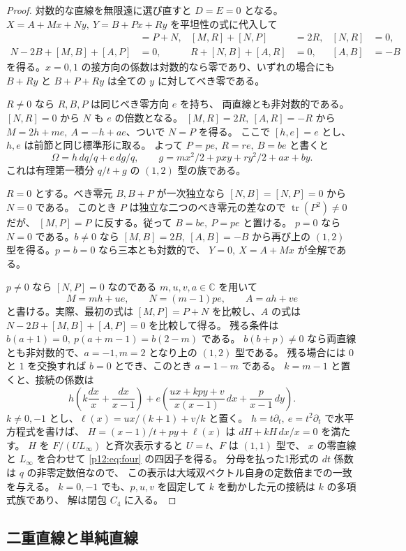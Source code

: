 \begin{proof}
対数的な直線を無限遠に選び直すと $D=E=0$ となる。
$X=A+Mx+Ny,\ Y=B+Px+Ry$ を平坦性の式に代入して
\begin{align*}
 [M,P]&=P+N, & [M,R]+[N,P]&=2R,&[N,R]&=0,\\
 N-2B+[M,B]+[A,P]&=0, & R+[N,B]+[A,R]&=0,&[A,B]&=-B
\end{align*}
を得る。$x=0,1$ の接方向の係数は対数的なら零であり、いずれの場合にも
$B+Ry$ と $B+P+Ry$ は全ての $y$ に対してべき零である。

$R\ne0$ なら $R,B,P$ は同じべき零方向 $e$ を持ち、
両直線とも非対数的である。$[N,R]=0$ から $N$ も $e$ の倍数となる。
$[M,R]=2R,\ [A,R]=-R$ から $M=2h+m e,\ A=-h+a e$、ついで $N=P$ を得る。
ここで $[h,e]=e$ とし、$h,e$ は前節と同じ標準形に取る。
よって $P=p e,\ R=r e,\ B=b e$ と書くと
\[
  \Omega=h\,dq/q+e\,dg/q,\qquad
  g=mx^2/2+p xy+r y^2/2+ax+by.
\]
これは有理第一積分 $q/t+g$ の $(1,2)$ 型の族である。

$R=0$ とする。べき零元 $B,B+P$ が一次独立なら $[N,B]=[N,P]=0$ から $N=0$ である。
このとき $P$ は独立な二つのべき零元の差なので $\operatorname{tr}(P^2)\ne0$ だが、
$[M,P]=P$ に反する。従って $B=b e,\ P=p e$ と置ける。
$p=0$ なら $N=0$ である。$b\ne0$ なら $[M,B]=2B,\ [A,B]=-B$
から再び上の $(1,2)$ 型を得る。$p=b=0$ なら三本とも対数的で、
$Y=0,\ X=A+Mx$ が全解である。

$p\ne0$ なら $[N,P]=0$ なのである $m,u,v,a\in\mathbb C$ を用いて
\[
 M=m h+u e,\qquad N=(m-1)p e,\qquad A=a h+v e
\]
と書ける。実際、最初の式は $[M,P]=P+N$ を比較し、$A$ の式は
$N-2B+[M,B]+[A,P]=0$ を比較して得る。
残る条件は $b(a+1)=0,\ p(a+m-1)=b(2-m)$ である。
$b(b+p)\ne0$ なら両直線とも非対数的で、$a=-1,m=2$ となり上の $(1,2)$ 型である。
残る場合には $0$ と $1$ を交換すれば $b=0$ とでき、このとき $a=1-m$ である。
$k=m-1$ と置くと、接続の係数は
\[
 h\left(k\frac{dx}{x}+\frac{dx}{x-1}\right)
 +e\left(\frac{ux+kpy+v}{x(x-1)}\,dx+\frac{p}{x-1}\,dy\right).
\]
$k\ne0,-1$ とし、$\ell(x)=u x/(k+1)+v/k$ と置く。
$h=t\partial_t,\ e=t^2\partial_t$ で水平方程式を書けば、
$H=(x-1)/t+p y+\ell(x)$ は $dH+kH\,dx/x=0$ を満たす。
$H$ を $F/(U L_\infty)$ と斉次表示すると $U=t$、$F$ は $(1,1)$ 型で、
$x$ の零直線と $L_\infty$ を合わせて \eqref{p12:eq:four} の四因子を得る。
分母を払った1形式の $dt$ 係数は $q$ の非零定数倍なので、
この表示は大域双ベクトル自身の定数倍までの一致を与える。
$k=0,-1$ でも、$p,u,v$ を固定して $k$ を動かした元の接続は $k$ の多項式族であり、
解は閉包 $C_4$ に入る。
\end{proof}


\subsection{二重直線と単純直線}
